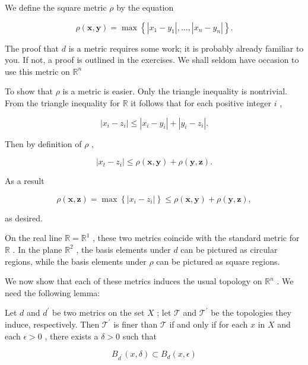 We define the square metric \(\rho\) by the equation

\[
\rho \left( {\mathbf{x},\mathbf{y}}\right)  = \max \left\{  {\left| {{x}_{1} - {y}_{1}}\right| ,\ldots ,\left| {{x}_{n} - {y}_{n}}\right| }\right\}  .
\]

The proof that \(d\) is a metric requires some work; it is probably already familiar to you. If not, a proof is outlined in the exercises. We shall seldom have occasion to use this metric on \({\mathbb{R}}^{n}\)

To show that \(\rho\) is a metric is easier. Only the triangle inequality is nontrivial. From the triangle inequality for \(\mathbb{R}\) it follows that for each positive integer \(i\) ,

\[
\left| {{x}_{i} - {z}_{i}}\right|  \leq  \left| {{x}_{i} - {y}_{i}}\right|  + \left| {{y}_{i} - {z}_{i}}\right| .
\]

Then by definition of \(\rho\) ,

\[
\left| {{x}_{t} - {z}_{i}}\right|  \leq  \rho \left( {\mathbf{x},\mathbf{y}}\right)  + \rho \left( {\mathbf{y},\mathbf{z}}\right) .
\]

As a result

\[
\rho \left( {\mathbf{x},\mathbf{z}}\right)  = \max \left\{  \left| {{x}_{i} - {z}_{i}}\right| \right\}   \leq  \rho \left( {\mathbf{x},\mathbf{y}}\right)  + \rho \left( {\mathbf{y},\mathbf{z}}\right) ,
\]

as desired.

On the real line \(\mathbb{R} = {\mathbb{R}}^{1}\) , these two metrics coincide with the standard metric for \(\mathbb{R}\) . In the plane \({\mathbb{R}}^{2}\) , the basis elements under \(d\) can be pictured as circular regions, while the basis elements under \(\rho\) can be pictured as square regions.

We now show that each of these metrics induces the usual topology on \({\mathbb{R}}^{n}\) . We need the following lemma:

\begin{lemma} Let \(d\) and \({d}^{\prime }\) be two metrics on the set \(X\) ; let \(\mathcal{T}\) and \({\mathcal{T}}^{\prime }\) be the topologies they induce, respectively. Then \({\mathcal{T}}^{\prime }\) is finer than \(\mathcal{T}\) if and only if for each \(x\) in \(X\) and each \(\epsilon  > 0\) , there exists a \(\delta  > 0\) such that

\[
{B}_{{d}^{\prime }}\left( {x,\delta }\right)  \subset  {B}_{d}\left( {x,\epsilon }\right)
\]
\end{lemma}

